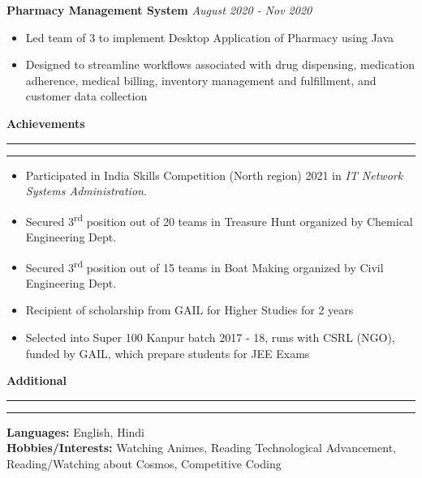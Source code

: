 \documentclass[11pt]{article}
\begin{document}
    	\hspace{8pt}\textbf{Pharmacy Management System}
    	\href{https://github.com/Abhay811/DBMS}{\color{blue}}
    	\hfill
    	\textit{August 2020 - Nov 2020}
    	\vspace{-6pt}
    	\begin{itemize}
        	\setlength{\itemsep}{0pt}
        	\setlength{\parskip}{0pt}
        	\setlength{\parsep}{0pt}
        	\item Led team of 3 to implement Desktop Application of Pharmacy using Java
        	\item Designed to streamline workflows associated with drug dispensing, medication adherence, medical billing, inventory management and fulfillment, and customer data collection
        \end{itemize}
    \textbf{\large{Achievements}}
    	\vspace{5pt}
    	\hrule \hrule
    	\vspace{-4pt}
   	    \begin{itemize}
        	\setlength{\itemsep}{0pt}
        	\setlength{\parskip}{0pt}
        	\setlength{\parsep}{0pt}
        	\item Participated in India Skills Competition (North region) 2021 in \textit{IT Network Systems Administration}.\href{https://drive.google.com/file/d/1nsGsz80LLaZx6pFgHgyKvapQtIfYAGc4/view?usp=sharing}{\color{blue}}
        	\item Secured 3\textsuperscript{rd} position out of 20 teams in Treasure Hunt organized by Chemical Engineering Dept.
        	\item Secured 3\textsuperscript{rd} position out of 15 teams in Boat Making organized by Civil Engineering Dept.
        	\item Recipient of scholarship from GAIL for Higher Studies for 2 years
        	\item Selected into Super 100 Kanpur batch 2017 - 18, runs with CSRL (NGO), funded by GAIL, which prepare students for JEE Exams
    	\end{itemize}
    
    \textbf{\large{Additional}}
    	\vspace{5pt}
    	\hrule \hrule
    	\vspace{4pt}
    	\textbf{Languages:} English, Hindi\\
    	\textbf{Hobbies/Interests:} Watching Animes, Reading Technological Advancement, Reading/Watching about Cosmos, Competitive Coding
    
\end{document}
